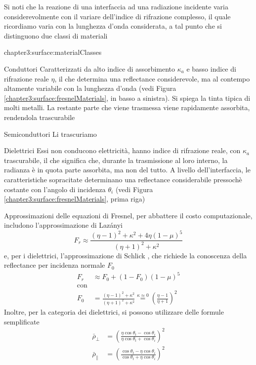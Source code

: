 Si noti che la reazione di una interfaccia ad una radiazione incidente varia considerevolmente con il variare dell'indice di rifrazione complesso,
il quale ricordiamo varia con la lunghezza d'onda considerata, a tal punto che si distinguono due classi di materiali
\begin{altDescription}{chapter3:surface:materialClasses}\label{chapter3:surface:materialClasses}
	\item[Conduttori] Caratterizzati da alto indice di assorbimento $\kappa_a$ e basso indice di rifrazione reale $\eta$, 
		il che determina una reflectance considerevole, ma al contempo altamente variabile con la lunghezza d'onda (vedi 
		Figura \ref{chapter3:surface:fresnelMaterials}, in basso a sinistra). Si spiega la tinta tipica di molti metalli. La restante parte che 
		viene trasmessa viene rapidamente assorbita, rendendola trascurabile
	\item[Semiconduttori] Li trascuriamo
	\item[Dielettrici] Essi non conducono elettricit\`a, hanno indice di rifrazione reale, con $\kappa_a$ trascurabile, il che significa che, durante
		la trasmissione al loro interno, la radianza \`e in quota parte assorbita, ma non del tutto. A livello dell'interfaccia, le caratteristiche
		sopracitate determinano una reflectance considerabile pressoch\`e costante con l'angolo di incidenza $\theta_i$ (vedi Figura 
		\ref{chapter3:surface:fresnelMaterials}, prima riga)
\end{altDescription}
Approssimazioni delle equazioni di Fresnel, per abbattere il costo computazionale, includono l'approssimazione di Laz\'anyi \cite{laza-fresnel}
\begin{equation}\label{chapter3:surface:lazaFresnel}
	F_r \approx \frac{(\eta-1)^2+\kappa^2+4\eta(1-\mu)^5}{(\eta+1)^2+\kappa^2}
\end{equation}
e, per i dielettrici, l'approssimazione di Schlick \cite{sch-fresnel}, che richiede la conoscenza della reflectance per incidenza normale $F_0$
\begin{align}\label{chapter3:surface:schFresnel}
	F_r &\approx F_0+(1-F_0)(1-\mu)^5 \\
	\text{con} \nonumber \\
	F_0 &= \frac{(\eta-1)^2+\kappa^2}{(\eta+1)^2+\kappa^2} \stackrel{\kappa\approx0}{=} \left(\frac{\eta-1}{\eta+1}\right)^2 \nonumber
\end{align}
Inoltre, per la categoria dei dielettrici, si possono utilizzare delle formule semplificate
\begin{align}\label{chapter3:surface:fresnelDielectric}
	\bar{\rho}_\perp &= \left(\frac{\eta\cos\theta_t-\cos\theta_i}{\eta\cos\theta_t+\cos\theta_i}\right)^2 \\
	\bar{\rho}_\parallel &= \left(\frac{\cos\theta_t-\eta\cos\theta_i}{\cos\theta_t+\eta\cos\theta_i}\right)^2
\end{align}

